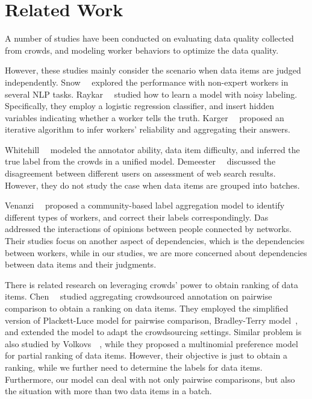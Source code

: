 \section{Related Work}
\label{sec:related}

A number of studies have been conducted on evaluating data quality collected from crowds, 
and modeling worker behaviors to optimize the data quality.  

However, these studies mainly consider the scenario when data items are judged independently.  
Snow~\etal~\cite{snow:emnlp2008} explored the performance with non-expert workers in several NLP tasks.
Raykar~\etal~\cite{raykar:nips2011ranking,raykar:icml2009,raykar:jmlr2010}
studied how to learn a model with noisy labeling. 
Specifically, they employ a logistic regression classifier, 
and insert hidden variables indicating whether a worker tells the truth. 
Karger~\etal~\cite{karger:nips2011} proposed an iterative algorithm to infer workers' reliability 
and aggregating their answers.  

Whitehill~\etal~\cite{whitehill:nips2009} modeled the annotator ability, data item difficulty, and inferred the true label from the crowds in a unified model.
Demeester~\etal~\cite{demeester:wsdm2014} discussed the disagreement between different users on assessment of web search results.
However, they do not study the case when data items are grouped into batches.

Venanzi~\etal~\cite{venanzi:www2014} proposed a community-based label aggregation model to identify different types of workers, 
and correct their labels correspondingly.  
Das~\etal~\cite{das:kdd2013} addressed the interactions of opinions between people connected by networks.
Their studies focus on another aspect of dependencies, 
which is the dependencies between workers, 
while in our studies, we are more concerned about dependencies between data items and their judgments.  


There is related research on leveraging crowds' power to obtain ranking of data items.  
Chen~\etal~\cite{chen:wsdm2013} studied aggregating crowdsourced annotation on pairwise comparison to obtain a ranking on data items. 
They employed the simplified version of Plackett-Luce model for pairwise comparison, Bradley-Terry model~\cite{bradley:1952}, 
and extended the model to adapt the crowdsourcing settings.  
Similar problem is also studied by Volkovs~\etal~\cite{volkovs:www2012}, 
while they proposed a multinomial preference model for partial ranking of data items.  
However, their objective is just to obtain a ranking, 
while we further need to determine the labels for data items.  
Furthermore, our model can deal with not only pairwise comparisons, 
but also the situation with more than two data items in a batch.  

